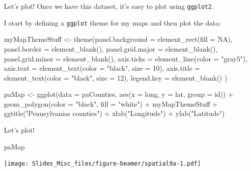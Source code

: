 \documentclass[
  ignorenonframetext,
]{beamer}
\newenvironment{Shaded}{\begin{snugshade}}{\end{snugshade}}
\newcommand{\AttributeTok}[1]{\textcolor[rgb]{0.77,0.63,0.00}{#1}}
\newcommand{\ConstantTok}[1]{\textcolor[rgb]{0.00,0.00,0.00}{#1}}
\newcommand{\DecValTok}[1]{\textcolor[rgb]{0.00,0.00,0.81}{#1}}
\newcommand{\FunctionTok}[1]{\textcolor[rgb]{0.00,0.00,0.00}{#1}}
\newcommand{\NormalTok}[1]{#1}
\newcommand{\OtherTok}[1]{\textcolor[rgb]{0.56,0.35,0.01}{#1}}
\newcommand{\SpecialCharTok}[1]{\textcolor[rgb]{0.00,0.00,0.00}{#1}}
\newcommand{\StringTok}[1]{\textcolor[rgb]{0.31,0.60,0.02}{#1}}
\begin{document}
\begin{frame}[fragile]{Let's plot!}
\protect\hypertarget{lets-plot-2}{}
Once we have this dataset, it's easy to plot using \texttt{ggplot2}.

I start by defining a \texttt{ggplot} theme for my maps and then plot
the data:

\tiny

\begin{Shaded}
\begin{Highlighting}[]
\NormalTok{myMapThemeStuff }\OtherTok{\textless{}{-}} \FunctionTok{theme}\NormalTok{(}\AttributeTok{panel.background =} \FunctionTok{element\_rect}\NormalTok{(}\AttributeTok{fill =} \ConstantTok{NA}\NormalTok{),}
    \AttributeTok{panel.border =} \FunctionTok{element\_blank}\NormalTok{(),}
    \AttributeTok{panel.grid.major =} \FunctionTok{element\_blank}\NormalTok{(),}
    \AttributeTok{panel.grid.minor =} \FunctionTok{element\_blank}\NormalTok{(),}
    \AttributeTok{axis.ticks =} \FunctionTok{element\_line}\NormalTok{(}\AttributeTok{color =} \StringTok{"gray5"}\NormalTok{),}
    \AttributeTok{axis.text =} \FunctionTok{element\_text}\NormalTok{(}\AttributeTok{color =} \StringTok{"black"}\NormalTok{, }\AttributeTok{size =} \DecValTok{10}\NormalTok{),}
    \AttributeTok{axis.title =} \FunctionTok{element\_text}\NormalTok{(}\AttributeTok{color =} \StringTok{"black"}\NormalTok{, }\AttributeTok{size =} \DecValTok{12}\NormalTok{),}
    \AttributeTok{legend.key =} \FunctionTok{element\_blank}\NormalTok{()}
\NormalTok{)}

\NormalTok{paMap }\OtherTok{\textless{}{-}} \FunctionTok{ggplot}\NormalTok{(}\AttributeTok{data =}\NormalTok{ paCounties, }\FunctionTok{aes}\NormalTok{(}\AttributeTok{x =}\NormalTok{ long, }\AttributeTok{y =}\NormalTok{ lat, }\AttributeTok{group =}\NormalTok{ id)) }\SpecialCharTok{+}
    \FunctionTok{geom\_polygon}\NormalTok{(}\AttributeTok{color =} \StringTok{"black"}\NormalTok{, }\AttributeTok{fill =} \StringTok{"white"}\NormalTok{) }\SpecialCharTok{+}
\NormalTok{    myMapThemeStuff }\SpecialCharTok{+} 
    \FunctionTok{ggtitle}\NormalTok{(}\StringTok{"Pennsylvania\textquotesingle{}s counties"}\NormalTok{) }\SpecialCharTok{+}
    \FunctionTok{xlab}\NormalTok{(}\StringTok{"Longitude"}\NormalTok{) }\SpecialCharTok{+} 
    \FunctionTok{ylab}\NormalTok{(}\StringTok{"Latitude"}\NormalTok{)}
\end{Highlighting}
\end{Shaded}
\end{frame}

\begin{frame}[fragile]{Let's plot!}
\protect\hypertarget{lets-plot-3}{}
\begin{Shaded}
\begin{Highlighting}[]
\NormalTok{paMap}
\end{Highlighting}
\end{Shaded}

\texttt{[image: Slides\_Misc\_files/figure-beamer/spatial9a-1.pdf]}
\end{frame}
\end{document}

